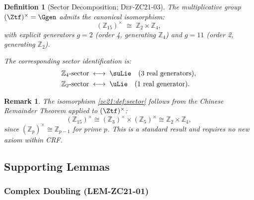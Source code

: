 \documentclass[12pt, a4paper]{article}
\newtheorem{definition}{Definition}[section]
\newtheorem{remark}{Remark}[section]
\begin{document}
\begin{definition}[Sector Decomposition; \textsc{Def-ZC21-03}]
\label{zc21:def:sector}
The multiplicative group $(\Ztf)^\times = \Ggen$
admits the canonical isomorphism:
\begin{equation}
  (\mathbb{Z}_{15})^\times \;\cong\; \mathbb{Z}_2 \times \mathbb{Z}_4,
  \tag{DEF-ZC21-03}
\end{equation}
with explicit generators $g=2$ (order 4, generating $\mathbb{Z}_4$)
and $g=11$ (order 2, generating $\mathbb{Z}_2$).

The corresponding \emph{sector identification} is:
\begin{align*}
  \mathbb{Z}_4\text{-sector} &\;\longleftrightarrow\; \suLie
    \quad\text{(3 real generators)},\\
  \mathbb{Z}_2\text{-sector} &\;\longleftrightarrow\; \uLie
    \quad\text{(1 real generator)}.
\end{align*}
\end{definition}

\begin{remark}
The isomorphism \eqref{zc21:def:sector} follows from the Chinese Remainder
Theorem applied to $(\Ztf)^\times$:
\begin{equation*}
  (\mathbb{Z}_{15})^\times
  \cong (\mathbb{Z}_3)^\times \times (\mathbb{Z}_5)^\times
  \cong \mathbb{Z}_2 \times \mathbb{Z}_4,
\end{equation*}
since $(\mathbb{Z}_p)^\times \cong \mathbb{Z}_{p-1}$ for prime $p$.
This is a standard result and requires no new axiom within CRF.
\end{remark}

\subsection{Supporting Lemmas}
\label{zc21:sec:lemmas}

\subsubsection{Complex Doubling (LEM-ZC21-01)}
\end{document}
